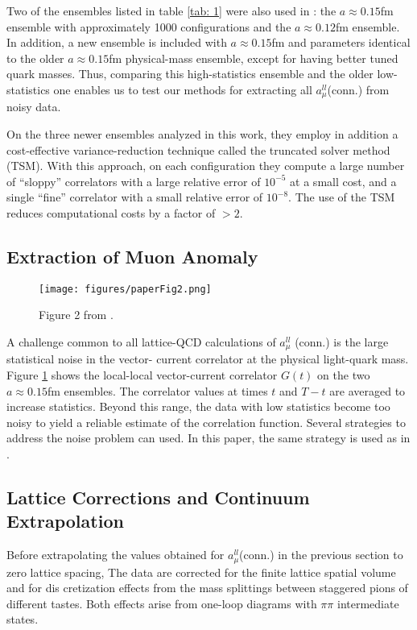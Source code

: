 \documentclass[amsfonts, amssymb, amsmath, preprint, showkeys, nofootinbib,longbibliography]{revtex4-1}
\begin{document}
Two of the ensembles listed in table \ref{tab: 1} were also used in \cite{PhysRevD.96.034516}:
the $a \approx 0.15$fm ensemble with approximately 1000 configurations and the $a \approx 0.12$fm ensemble.
In addition, a new ensemble is included with $a \approx 0.15$fm and parameters identical to the older $a \approx 0.15$fm physical-mass ensemble, except for having better tuned quark masses.
Thus, comparing this high-statistics ensemble and the older low-statistics one enables us to test our methods for extracting all $ a_\mu^{ll}$(conn.) from noisy data.

On the three newer ensembles analyzed in this work, they employ in addition a cost-effective variance-reduction technique called the truncated solver method (TSM).
With this approach, on each configuration they compute a large number of “sloppy” correlators with a large relative error of $10^{−5}$ at a small cost, and a single “fine” correlator with a small relative error of $10^{−8}$.
The use of the TSM reduces computational costs by a factor of $>2$.


\subsection{Extraction of Muon Anomaly}
\label{sec: LatCalcB}
\begin{figure}[h]
	\centering
	\texttt{[image: figures/paperFig2.png]}
	\caption{%
	Figure 2 from \cite{Davies_2020}.
	}
	\label{fig: paperFig2}
\end{figure}

A challenge common to all lattice-QCD calculations
of $a_\mu^{ll}$ (conn.) is the large statistical noise in the vector- current correlator at the physical light-quark mass.
Figure \ref{fig: paperFig2} shows the local-local vector-current correlator $G(t)$ on the two $a \approx 0.15$fm ensembles.
The correlator values at times $t$ and $T-t$ are averaged to increase statistics.
Beyond this range, the data with low statistics become too noisy to yield a reliable estimate of the correlation function.
Several strategies to address the noise problem can used.
In this paper, the same strategy is used as in \cite{PhysRevD.96.034516}.

\subsection{Lattice Corrections and Continuum Extrapolation}
\label{sec: LatCalcC}

Before extrapolating the values obtained for $a_\mu^{ll}$(conn.) in the previous section to zero lattice spacing, The data are corrected for the finite lattice spatial volume and for dis cretization effects from the mass splittings between staggered pions of different tastes.
Both effects arise from one-loop diagrams with $\pi\pi$ intermediate states.
\end{document}
